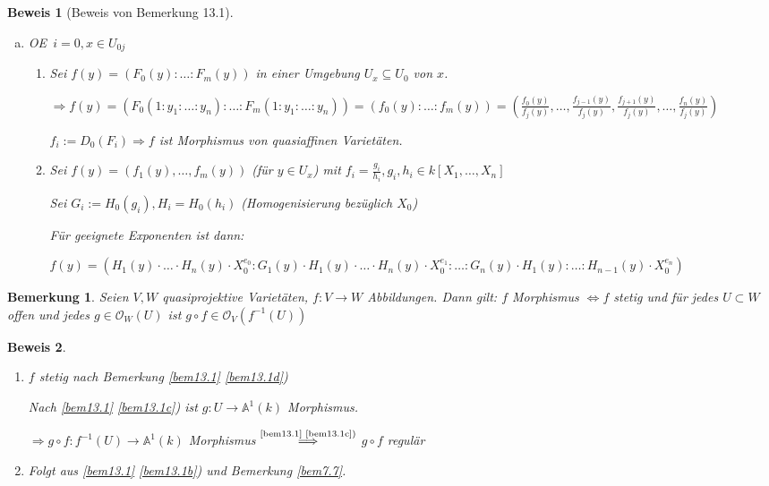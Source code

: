 \documentclass[a4paper, 12pt, numbers=noendperiod, chapterprefix=true, headsepline]{scrbook}
\theoremstyle{break}
\newtheorem{Bem}[Def]{Bemerkung}
\theoremstyle{nonumberbreak}
\newtheorem{Bew}{Beweis}
\theoremstyle{nonumberplain}
\newcommand{\quot}[1]{\textrm{\glqq}{#1}\textrm{\grqq}}
\newenvironment{twosidedproof}{\begin{enumerate}[\quot{$\Rightarrow$}:]}{\end{enumerate}}
\newcommand{\proofforward}{\item[\quot{$\Rightarrow$}:]}
\newcommand{\proofreverse}{\item[\quot{$\Leftarrow$}:]}
\newcommand{\A}{\mathbb{A}}
\newcommand{\calO}{\mathcal{O}}
\renewcommand{\OE}{O\!\!E~}
\begin{document}
\begin{Bew}[Beweis von Bemerkung 13.1]\begin{enumerate}[a)]
\item[b)]
	\OE $i=0,x\in U_{0j}$\begin{twosidedproof}
	\proofforward
		Sei $f(y)=(F_0(y):\ldots :F_m(y))$ in einer Umgebung $U_x\subseteq U_0$ von $x$.
		
		$\Rightarrow f(y)=(F_0(1:y_1:\ldots :y_n):\ldots :F_m(1:y_1:\ldots :y_n))=(f_0(y):\ldots :f_m(y))=(\frac{f_0(y)}{f_j(y)},\ldots ,\frac{f_{j-1}(y)}{f_j(y)}, \frac{f_{j+1}(y)}{f_j(y)},\ldots ,\frac{f_n(y)}{f_j(y)})$
		
		$f_i:=D_0(F_i)\Rightarrow f$ ist Morphismus von quasiaffinen Variet\"aten.

	\proofreverse
	Sei $f(y)=(f_1(y),\ldots ,f_m(y))$ (f\"ur $y\in U_x$) mit $f_i=\frac{g_i}{h_i}, g_i,h_i\in k[X_1,\ldots ,X_n]$
	
	Sei $G_i:=H_0(g_i), H_i=H_0(h_i)$ (Homogenisierung bez\"uglich $X_0$)
	
	F\"ur geeignete Exponenten ist dann:
	
		$f(y)=(H_1(y)\cdot\ldots \cdot H_n(y)\cdot X_0^{e_0}:G_1(y)\cdot H_1(y)\cdot\ldots \cdot H_n(y)\cdot X_0^{e_1}:\ldots :G_n(y)\cdot H_1(y):\ldots :H_{n-1}(y)\cdot X_0^{e_n})$
\end{twosidedproof}
\end{enumerate}\end{Bew}

\begin{Bem}
Seien $V,W$ quasiprojektive Variet\"aten, $f:V\to W$ Abbildungen. Dann gilt: $f$ Morphismus $\Leftrightarrow f$ stetig und f\"ur jedes $U\subset W$ offen und jedes $g\in \calO_W(U)$ ist $g\circ f \in \calO_V(f^{-1}(U))$
\end{Bem}

\begin{Bew}\begin{twosidedproof}
\proofforward
	$f$ stetig nach Bemerkung \ref{bem13.1} \ref{bem13.1d})
	
	Nach \ref{bem13.1} \ref{bem13.1c}) ist $g:U\to \A^1(k)$ Morphismus.
	
	$\Rightarrow g\circ f: f^{-1}(U)\to\A^1(k)$ Morphismus $\overset{\text{\ref{bem13.1} \ref{bem13.1c})}}{\Longrightarrow}$ $g\circ f$ regul\"ar
\proofreverse
	Folgt aus \ref{bem13.1} \ref{bem13.1b}) und Bemerkung \ref{bem7.7}.
\end{twosidedproof}\end{Bew}
\end{document}
